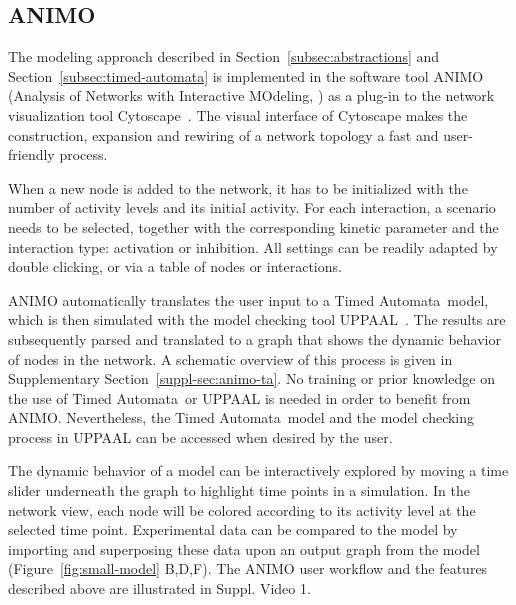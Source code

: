 \documentclass{bmcart}
\def\tas{Timed Automata}
\begin{document}
\subsection*{ANIMO}
The modeling approach described in Section~\ref{subsec:abstractions} and Section~\ref{subsec:timed-automata}
is implemented in the
software tool ANIMO (Analysis of Networks with Interactive MOdeling, \cite{animo-ieee}) as
a plug-in to the network visualization tool Cytoscape~\cite{cytoscape}. The visual interface of Cytoscape
makes the construction, expansion and rewiring of a network topology a fast and user-friendly process. 

When a new node is added to the network, it has to be initialized with the number of activity levels and 
its initial activity. 
For each interaction, a scenario needs to be selected, together with the corresponding kinetic parameter and 
the interaction type: activation or inhibition. All settings can be readily adapted by double clicking, or via a 
table of nodes or interactions. 

ANIMO automatically translates the user input to a \tas\ model, which is then simulated with the model 
checking tool UPPAAL~\cite{uppaal}. The results are subsequently parsed and translated to a graph that shows
the dynamic behavior of nodes in the network. 
A schematic overview of this process is given in Supplementary Section~\ref{suppl-sec:animo-ta}.
No training or prior knowledge on the use of \tas\ or UPPAAL is needed in order to benefit from ANIMO.
Nevertheless, the \tas\ model and the model checking process in UPPAAL can be accessed when desired by the user.

The dynamic behavior of a model can be interactively explored by
moving a time slider underneath the graph to highlight time points in a simulation. In the network view,
each node will be colored according to its activity level at the selected time point. 
Experimental data can be compared to the model by importing and superposing these data 
upon an output graph from the model (Figure~\ref{fig:small-model} B,D,F). The ANIMO user workflow and the 
features described above are illustrated in Suppl. Video 1.
\end{document}
